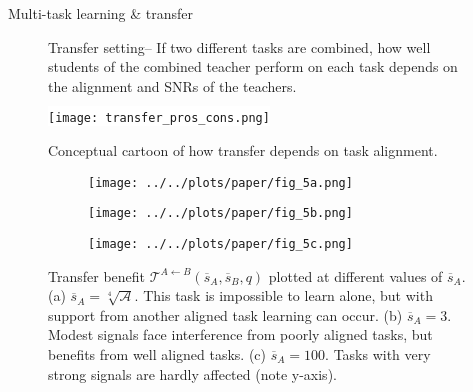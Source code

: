\documentclass[final]{beamer}
\begin{document}
\begin{frame}[t]{}
\begin{columns}
\begin{column}[t]{0.248\textwidth}
\begin{block}{\large Multi-task learning \& transfer}
\begin{figure}
\caption{Transfer setting-- If two different tasks are combined, how well students of the combined teacher perform on each task depends on the alignment and SNRs of the teachers.}
\label{transfer_conceptual_fig}
\vspace{-1em}
\end{figure}
\begin{figure}[H]
\centering
\colorbox{white}{
\texttt{[image: transfer\_pros\_cons.png]}
}
\caption{Conceptual cartoon of how transfer depends on task alignment.}
\label{transfer_cartoon_fig}
\end{figure}
\begin{figure}
\vspace{-1em}
\centering
\begin{subfigure}[t]{0.2\textwidth}
\texttt{[image: ../../plots/paper/fig\_5a.png]}
\label{fig2b}
\end{subfigure}%
\begin{subfigure}[t]{0.2\textwidth}
\texttt{[image: ../../plots/paper/fig\_5b.png]}
\label{fig2c}
\end{subfigure}%
\begin{subfigure}[t]{0.3\textwidth}
\texttt{[image: ../../plots/paper/fig\_5c.png]}
\label{fig2d}
\end{subfigure}%
\vspace{-1em}
\caption{Transfer benefit $\mathcal{T}^{A\leftarrow B}(\overline{s}_A, \overline{s}_B, q)$ plotted at different values of $\overline{s}_A$. (a) $\overline{s}_A = \sqrt[4]{\mathcal{A}}$. This task is impossible to learn alone, but with support from another aligned task learning can occur. (b) $\overline{s}_A = 3$. Modest signals face interference from poorly aligned tasks, but benefits from well aligned tasks. (c) $\overline{s}_A = 100$. Tasks with very strong signals are hardly affected (note y-axis).}
\label{fig5}
\vspace{-1em}

\end{figure}
\end{block}
\end{column}
\end{columns}
\end{frame}
\end{document}
